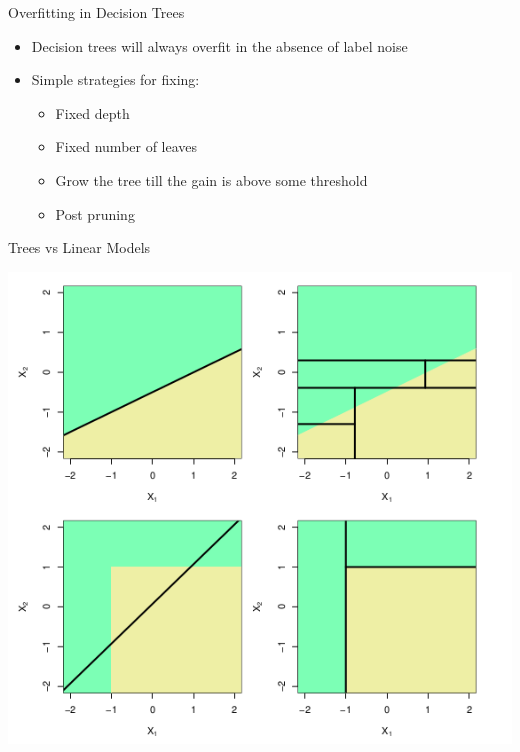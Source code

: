\documentclass{beamer}
\begin{document}
\begin{frame}{Overfitting in Decision Trees}
    \begin{itemize}
        \item Decision trees will always overfit in the absence of label noise
        \item Simple strategies for fixing:
        \begin{itemize}
            \item Fixed depth
            \item Fixed number of leaves
            \item Grow the tree till the gain is above some threshold
            \item Post pruning
        \end{itemize}
    \end{itemize}
\end{frame}

\begin{frame}{Trees vs Linear Models}
    \begin{center}
        \includegraphics[scale=0.4]{treesVsLinearModels.png}
    \end{center}
\end{frame}
\end{document}
